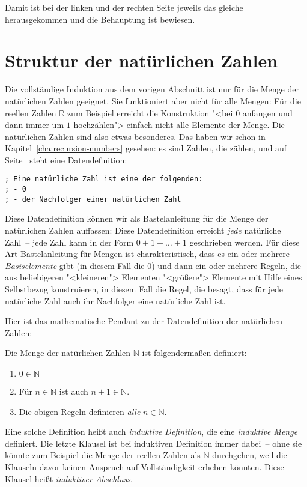 Damit ist bei der linken und der rechten Seite jeweils das gleiche
herausgekommen und die Behauptung ist bewiesen.

\section{Struktur der natürlichen Zahlen}

Die vollständige Induktion aus dem vorigen Abschnitt ist nur für die
Menge der natürlichen Zahlen geeignet.  Sie funktioniert aber nicht für alle
Mengen: Für die reellen Zahlen $\mathbb{R}$ zum Beispiel erreicht die
Konstruktion "<bei $0$ anfangen und dann immer um $1$ hochzählen"> einfach
nicht alle Elemente der Menge.%
Die
natürlichen Zahlen sind also etwas besonderes.  Das haben wir schon in
Kapitel~\ref{cha:recursion-numbers} gesehen: es sind Zahlen, die zählen,
und auf Seite~\pageref{page:datendefinition-N} steht eine
Datendefinition:
%
\begin{lstlisting}
; Eine natürliche Zahl ist eine der folgenden:
; - 0
; - der Nachfolger einer natürlichen Zahl
\end{lstlisting}
%
Diese Datendefinition können wir als Bastelanleitung für die Menge der
natürlichen Zahlen auffassen:
Diese Datendefinition erreicht \emph{jede} natürliche Zahl~-- jede Zahl kann
in der Form $0+1+\ldots+1$ geschrieben werden.  Für diese Art
Bastelanleitung für Mengen ist charakteristisch, dass es ein oder
mehrere \textit{Basiselemente} gibt (in diesem
Fall die $0$) und dann ein oder mehrere Regeln, die aus beliebigeren
"<kleineren"> Elementen "<größere"> Elemente mit Hilfe eines Selbstbezug konstruieren, in diesem
Fall die Regel, die besagt, dass für jede natürliche Zahl auch ihr
Nachfolger eine natürliche Zahl ist.

Hier ist das mathematische Pendant zu der Datendefinition der natürlichen
Zahlen:
%
\begin{definition}
  \label{def:N}
  Die Menge der natürlichen Zahlen $\mathbb{N}$ ist folgendermaßen definiert:
  \begin{enumerate}
  \item $0\in\mathbb{N}$
  \item Für $n\in\mathbb{N}$ ist auch $n+1\in\mathbb{N}$.
  \item Die obigen Regeln definieren \emph{alle} $n\in\mathbb{N}$.
  \end{enumerate}
\end{definition}
% 
Eine solche Definition heißt auch \textit{induktive
  Definition}, die eine \textit{induktive
  Menge} definiert.  Die letzte Klausel ist bei
induktiven Definition immer dabei~--
ohne sie könnte zum Beispiel die Menge der reellen
Zahlen als $\mathbb{N}$ durchgehen, weil die Klauseln davor 
keinen Anspruch auf Vollständigkeit erheben könnten.  Diese Klausel
heißt \textit{induktiver Abschluss}.

